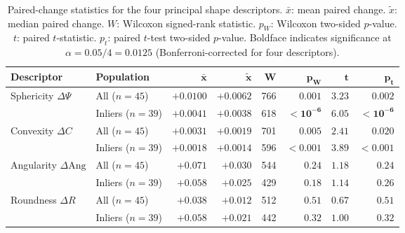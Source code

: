 \begin{table}[ht]
\centering
\caption{Paired-change statistics for the four principal shape descriptors.
         $\bar{x}$: mean paired change. $\tilde{x}$: median paired change.
         $W$: Wilcoxon signed-rank statistic. $p_W$: Wilcoxon two-sided
         $p$-value. $t$: paired $t$-statistic. $p_t$: paired $t$-test
         two-sided $p$-value. Boldface indicates significance at
         $\alpha = 0.05/4 = 0.0125$ (Bonferroni-corrected for four
         descriptors).}
\label{tab:morph-stat-summary}
\small
{}
\begin{adjustbox}{max width=\textwidth}
\begin{tabular}{@{}llrrrrrr@{}}
    \toprule
    \rowcolor{tablehdr}
    {\color{white}\textbf{Descriptor}}
    & {\color{white}\textbf{Population}}
    & {\color{white}$\boldsymbol{\bar{x}}$}
    & {\color{white}$\boldsymbol{\tilde{x}}$}
    & {\color{white}$\boldsymbol{W}$}
    & {\color{white}$\boldsymbol{p_W}$}
    & {\color{white}$\boldsymbol{t}$}
    & {\color{white}$\boldsymbol{p_t}$}\\
    \midrule
    Sphericity $\Delta\Psi$
        & All ($n=45$) & $+0.0100$ & $+0.0062$  & 766  & $\mathbf{0.001}$ & $3.23$ & $\mathbf{0.002}$\\
        & Inliers ($n=39$) & $+0.0041$ & $+0.0038$  & 618  & $\mathbf{<10^{-6}}$ & $6.05$ & $\mathbf{<10^{-6}}$\\
    Convexity $\Delta C$
        & All ($n=45$) & $+0.0031$ & $+0.0019$  & 701  & $\mathbf{0.005}$ & $2.41$ & $0.020$\\
        & Inliers ($n=39$) & $+0.0018$ & $+0.0014$  & 596  & $\mathbf{<0.001}$ & $3.89$ & $\mathbf{<0.001}$\\
    Angularity $\Delta\mathrm{Ang}$
        & All ($n=45$) & $+0.071$  & $+0.030$   & 544  & $0.24$ & $1.18$ & $0.24$\\
        & Inliers ($n=39$) & $+0.058$  & $+0.025$   & 429  & $0.18$ & $1.14$ & $0.26$\\
    Roundness $\Delta R$
        & All ($n=45$) & $+0.038$  & $+0.012$   & 512  & $0.51$ & $0.67$ & $0.51$\\
        & Inliers ($n=39$) & $+0.058$  & $+0.021$   & 442  & $0.32$ & $1.00$ & $0.32$\\
    \bottomrule
\end{tabular}
\end{adjustbox}
\end{table}

